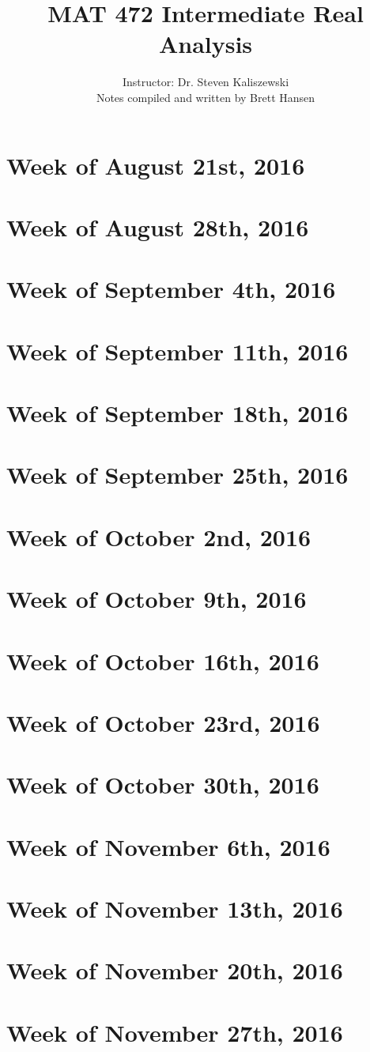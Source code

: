 \documentclass{article}
\title{MAT 472 Intermediate Real Analysis}
\author{
{\Large Instructor: Dr. Steven Kaliszewski} \\
Notes compiled and written by Brett Hansen
}
\date{}
\begin{document}
\maketitle
\tableofcontents
\break

\section{Week of August 21st, 2016}
\section{Week of August 28th, 2016}
\section{Week of September 4th, 2016}
\section{Week of September 11th, 2016}
\section{Week of September 18th, 2016}
\section{Week of September 25th, 2016}
\section{Week of October 2nd, 2016}
\section{Week of October 9th, 2016}
\section{Week of October 16th, 2016}
\section{Week of October 23rd, 2016}
\section{Week of October 30th, 2016}
\section{Week of November 6th, 2016}
\section{Week of November 13th, 2016}
\section{Week of November 20th, 2016}
\section{Week of November 27th, 2016}
\end{document}

